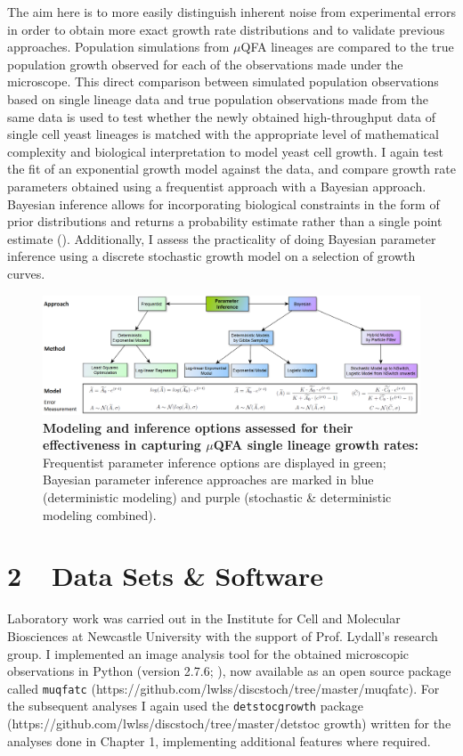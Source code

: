 \documentclass{bioinfo}
\begin{document}
{The aim here is to more easily distinguish inherent noise from experimental errors in order to obtain more exact growth rate distributions and to validate previous approaches. Population simulations from $\mu$QFA lineages are compared to the true population growth observed for each of the observations made under the microscope. This direct comparison between simulated population observations based on single lineage data and true population observations made from the same data is used to test whether the newly obtained high-throughput data of single cell yeast lineages is matched with the appropriate level of mathematical complexity and biological interpretation to model yeast cell growth. I again test the fit of an exponential growth model against the data, and compare growth rate parameters obtained using a frequentist approach with a Bayesian approach. Bayesian inference allows for incorporating biological constraints in the form of prior distributions and returns a probability estimate rather than a single point estimate (\citealp{Christensen11}). Additionally, I assess the practicality of doing Bayesian parameter inference using a discrete stochastic growth model on a selection of growth curves. 

\begin{figure}[hb!]
\includegraphics[width=1\linewidth]{Ch2ParInf.png}
\vspace{-2em}
\caption{\footnotesize{\textbf{Modeling and inference options assessed for their effectiveness in capturing $\mu$QFA single lineage growth rates:} Frequentist parameter inference options are displayed in green; Bayesian parameter inference approaches are marked in blue (deterministic modeling) and purple (stochastic \& deterministic modeling combined).}}
\label{fig:ParInf}
\vspace{-3em}
\end{figure}

\vspace{-2em}
\section*{2 $\>\>$ Data Sets \& Software}
Laboratory work was carried out in the Institute for Cell and Molecular Biosciences at Newcastle University with the support of Prof. Lydall's research group. I implemented an image analysis tool for the obtained microscopic observations in Python (version 2.7.6; \citealp{Rossum95}), now available as an open source package called \texttt{muqfatc} (https://github.com/lwlss/discstoch/tree/master/muqfatc). For the subsequent analyses I again used the \texttt{detstocgrowth} package (https://github.com/lwlss/discstoch/tree/master/detstoc growth) written for the analyses done in Chapter 1, implementing additional features where required.

}
\end{document}
